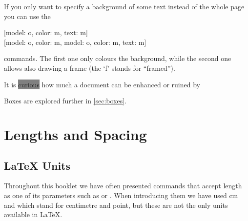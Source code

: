 If you only want to specify a background of some text instead of the whole page
you can use the
\begin{lscommand}
  [model: o, color: m, text: m] \\
  [model: o, color: m, model: o, color: m, text: m]
\end{lscommand}
commands. The first one only colours the background, while the second one
allows also drawing a frame (the \enquote*{f} stands for \enquote{framed}).
\begin{example}
It is \colorbox{gray}{curious}
how much a document can be
enhanced or ruined by
\end{example}
Boxes are explored further in \autoref{sec:boxes}.

\section{Lengths and Spacing}

\subsection{\LaTeX{} Units}%
\label{sec:dimensions}
\begingroup
{}
\ExplSyntaxOn
{}

\ExplSyntaxOff

Throughout this booklet we have often presented commands that accept length as
one of its parameters such as \csi{\bs} or . When introducing
them we have used \unit{\cm} and \unit{\pt} which stand for centimetre and
point, but these are not the only units available in \LaTeX{}.


